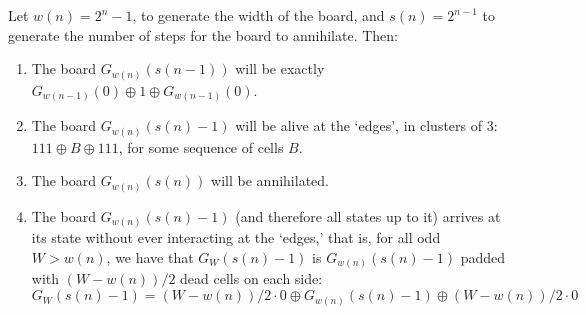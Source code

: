 \documentclass[12pt,letterpaper]{article}
\begin{document}
\begin{prop}\label{Power2} %
  Let $w(n)=2^n-1$, to generate the width of the board, and $s(n)=2^{n-1}$ to generate the number of steps for the board to annihilate. Then:%
  \begin{enumerate}[label=(\alph*)]
    \item\label{a} The board $G_{w(n)}(s(n-1))$ will be exactly $G_{w(n-1)}(0)\oplus 1\oplus G_{w(n-1)}(0)$.
    \item\label{b} The board $G_{w(n)}(s(n)-1)$ will be alive at the `edges', in clusters of 3: $111\oplus B\oplus 111$, for some sequence of cells $B$. 
    \item\label{c} The board $G_{w(n)}(s(n))$ will be annihilated.
    \item\label{d} The board $G_{w(n)}(s(n)-1)$ (and therefore all states up to it) arrives at its state without ever interacting at the `edges,' that is, for all odd $W>w(n)$, we have that $G_{W}(s(n)-1)$ is $G_{w(n)}(s(n)-1)$ padded with $(W-w(n))/2$ dead cells on each side: $$G_{W}(s(n)-1) = (W-w(n))/2\cdot 0 \oplus G_{w(n)}(s(n)-1) \oplus (W-w(n))/2\cdot 0$$
  \end{enumerate}
\end{prop}
\end{document}

